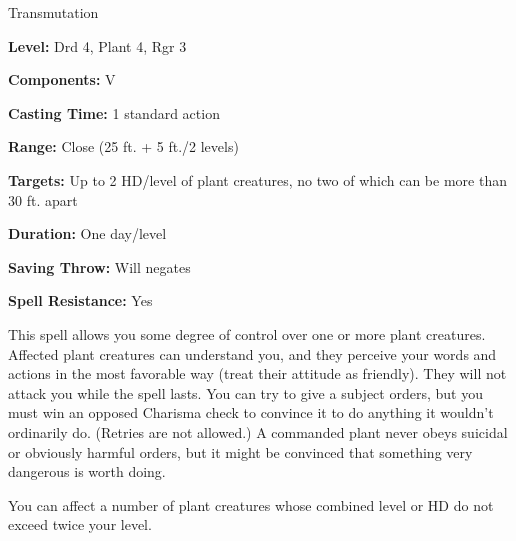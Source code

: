 
Transmutation

\textbf{Level:} Drd 4, Plant 4, Rgr 3

\textbf{Components:} V

\textbf{Casting Time:} 1 standard action

\textbf{Range:} Close (25 ft. + 5 ft./2 levels)

\textbf{Targets:} Up to 2 HD/level of plant creatures, no two of which can be more 
than 30 ft. apart

\textbf{Duration:} One day/level

\textbf{Saving Throw:} Will negates

\textbf{Spell Resistance:} Yes

This spell allows you some degree of control over one or more plant creatures. 
Affected plant creatures can understand you, and they perceive your words and actions 
in the most favorable way (treat their attitude as friendly). They will not attack 
you while the spell lasts. You can try to give a subject orders, but you must win 
an opposed Charisma check to convince it to do anything it wouldn't ordinarily 
do. (Retries are not allowed.) A commanded plant never obeys suicidal or obviously 
harmful orders, but it might be convinced that something very dangerous is worth 
doing.

You can affect a number of plant creatures whose combined level or HD do not exceed 
twice your level.

